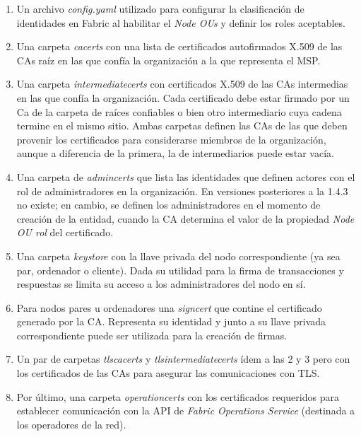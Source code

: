 \begin{enumerate}
	\item Un archivo \emph{config.yaml} utilizado para configurar la clasificaci\'on de identidades en Fabric al habilitar el \emph{Node OUs} y definir los roles aceptables.
	
	\item Una carpeta \emph{cacerts} con una lista de certificados autofirmados X.509 de las CAs ra\'iz en las que conf\'ia la organizaci\'on a la que representa el MSP.
	
	\item Una carpeta \emph{intermediatecerts} con certificados X.509 de las CAs intermedias en las que conf\'ia la organizaci\'on. Cada certificado debe estar firmado por un Ca de la carpeta de ra\'ices confiables o bien otro intermediario cuya cadena termine en el mismo sitio. Ambas carpetas definen las CAs de las que deben provenir los certificados para considerarse miembros de la organizaci\'on, aunque a diferencia de la primera, la de intermediarios puede estar vac\'ia.
	
	\item Una carpeta de \emph{admincerts} que lista las identidades que definen actores con el rol de administradores en la organizaci\'on. En versiones posteriores a la 1.4.3 no existe; en cambio, se definen los administradores en el momento de creaci\'on de la entidad, cuando la CA determina el valor de la propiedad \emph{Node OU rol} del certificado.
	
	
	\item Una carpeta \emph{keystore} con la llave privada del nodo correspondiente (ya sea par, ordenador o cliente). Dada su utilidad para la firma de transacciones y respuestas se limita su acceso a los administradores del nodo en s\'i. 
	
	\item Para nodos pares u ordenadores una \emph{signcert} que contine el certificado generado por la CA. Representa su identidad y junto a su llave privada correspondiente puede ser utilizada para la creaci\'on de firmas.
	
	\item Un par de carpetas \emph{tlscacerts} y \emph{tlsintermediatecerts} \'idem a las 2 y 3 pero con los certificados de las CAs para asegurar las comunicaciones con TLS.
	
	\item Por \'ultimo, una carpeta \emph{operationcerts} con los certificados requeridos para establecer comunicaci\'on con la API de \emph{Fabric Operations Service} (destinada a los operadores de la red).
\end{enumerate}

